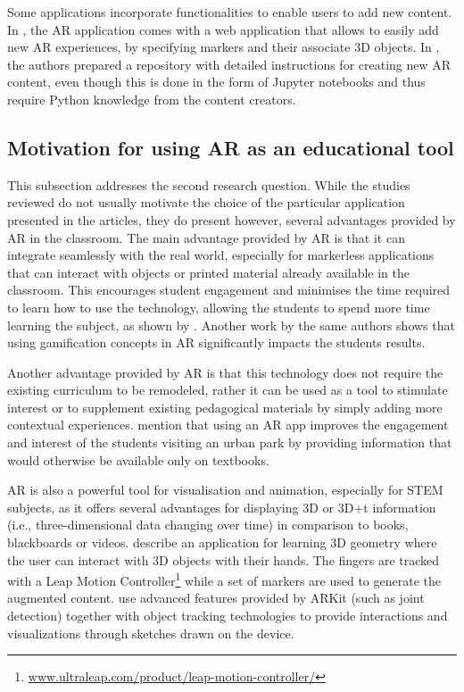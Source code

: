 Some applications incorporate functionalities to enable users to add new content. In \cite{costa2021interactive}, the AR application comes with a web application that allows to easily add new AR experiences, by specifying markers and their associate 3D objects. In \cite{wellmann2022open}, the authors prepared a repository with detailed instructions for creating new AR content, even though this is done in the form of Jupyter notebooks and thus require Python knowledge from the content creators.

\subsection{Motivation for using AR as an educational tool}

This subsection addresses the second research question. While the studies reviewed do not usually motivate the choice of the particular application presented in the articles, they do present however, several advantages provided by AR in the classroom. The main advantage provided by AR is that it can integrate seamlessly with the real world, especially for markerless applications that can interact with objects or printed material already available in the classroom. This encourages student engagement and minimises the time required to learn how to use the technology, allowing the students to spend more time learning the subject, as shown by \cite{thamrongrat2019design}. Another work by the same authors \citep{233-10.1145/3441000.3441034} shows that using gamification concepts in AR significantly impacts the students results.

Another advantage provided by AR is that this technology does not require the existing curriculum to be remodeled, rather it can be used as a tool to stimulate interest or to supplement existing pedagogical materials by simply adding more contextual experiences. \cite{pombo2018edupark} mention that using an AR app improves the engagement and interest of the students visiting an urban park by providing information that would otherwise be available only on textbooks.

AR is also a powerful tool for visualisation and animation, especially for STEM subjects, as it offers several advantages for displaying 3D or 3D+t information (i.e., three-dimensional data changing over time) in comparison to books, blackboards or videos. \cite{cao2019hand} describe an application for learning 3D geometry where the user can interact with 3D objects with their hands. The fingers are tracked with a Leap Motion Controller\footnote{\url{www.ultraleap.com/product/leap-motion-controller/}} while a set of markers are used to generate the augmented content. \cite{246-10.1145/3379350.3416155} use advanced features provided by ARKit (such as joint detection) together with object tracking technologies to provide interactions and visualizations through sketches drawn on the device.


